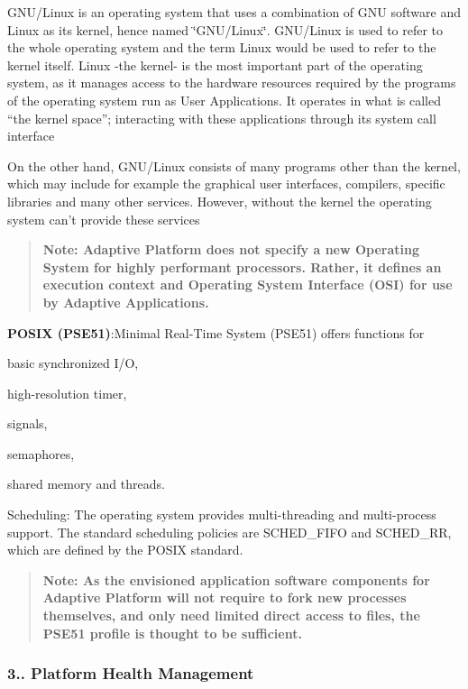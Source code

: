G\+N\+U/\+Linux is an operating system that uses a combination of G\+NU software and Linux as its kernel, hence named \char`\"{}\+G\+N\+U/\+Linux\char`\"{}. G\+N\+U/\+Linux is used to refer to the whole operating system and the term Linux would be used to refer to the kernel itself. Linux -\/the kernel-\/ is the most important part of the operating system, as it manages access to the hardware resources required by the programs of the operating system run as User Applications. It operates in what is called “the kernel space”; interacting with these applications through its system call interface

On the other hand, G\+N\+U/\+Linux consists of many programs other than the kernel, which may include for example the graphical user interfaces, compilers, specific libraries and many other services. However, without the kernel the operating system can’t provide these services  \begin{quote}
{\bfseries Note\+: Adaptive Platform does not specify a new Operating System for highly performant processors. Rather, it defines an execution context and Operating System Interface (O\+SI) for use by Adaptive Applications.} \end{quote}


{\bfseries P\+O\+S\+IX (P\+S\+E51)}\+:Minimal Real-\/\+Time System (P\+S\+E51) offers functions for
\begin{DoxyEnumerate}
\item basic synchronized I/O,
\item high-\/resolution timer,
\item signals,
\item semaphores,
\item shared memory and threads.
\end{DoxyEnumerate}

 Scheduling\+: The operating system provides multi-\/threading and multi-\/process support. The standard scheduling policies are S\+C\+H\+E\+D\+\_\+\+F\+I\+FO and S\+C\+H\+E\+D\+\_\+\+RR, which are defined by the P\+O\+S\+IX standard.

\begin{quote}
{\bfseries Note\+: As the envisioned application software components for Adaptive Platform will not require to fork new processes themselves, and only need limited direct access to files, the P\+S\+E51 profile is thought to be sufficient.} \end{quote}


\subsubsection*{3.. Platform Health Management}

